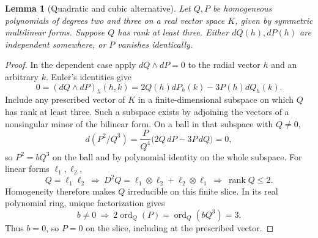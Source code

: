 \documentclass[11pt,letterpaper]{article}
\newtheorem{lemma}[theorem]{Lemma}
\newcommand{\rank}{\operatorname{rank}}
\begin{document}
\begin{lemma}[Quadratic and cubic alternative]\label{polynomials}
Let $Q,P$ be homogeneous polynomials of degrees two and three on a real
vector space $K$, given by symmetric multilinear forms. Suppose $Q$ has
rank at least three. Either $dQ(h),dP(h)$ are independent somewhere, or
$P$ vanishes identically.
\end{lemma}
\begin{proof}
In the dependent case apply $dQ\wedge dP=0$ to the radial vector $h$
and an arbitrary $k$. Euler's identities give
\[
 0=(dQ\wedge dP)_h(h,k)=2Q(h)dP_h(k)-3P(h)dQ_h(k).
\]
Include any prescribed vector of $K$ in a finite-dimensional subspace
on which $Q$ has rank at least three. Such a subspace exists by adjoining
the vectors of a nonsingular minor of the bilinear form. On a ball in
that subspace with $Q\ne0$,
\[
 d(P^2/Q^3)=\frac{P}{Q^4}\bigl(2Q\,dP-3P\,dQ\bigr)=0,
\]
so
$P^2=bQ^3$ on the ball and by polynomial identity on the whole subspace.
For linear forms $\ell_1,\ell_2$,
\[
 Q=\ell_1\ell_2\ \Longrightarrow\
 D^2Q=\ell_1\otimes\ell_2+\ell_2\otimes\ell_1
 \ \Longrightarrow\ \rank Q\le2 .
\]
Homogeneity therefore makes $Q$ irreducible on this finite slice.
In its real polynomial ring, unique factorization gives
\[
 b\ne0\ \Longrightarrow\
 2\operatorname{ord}_Q(P)=\operatorname{ord}_Q(bQ^3)=3 .
\]
Thus $b=0$, so $P=0$ on the slice, including at the prescribed vector.
\end{proof}
\end{document}
